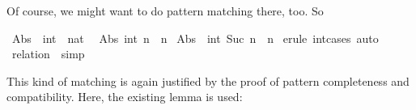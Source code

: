 \begin{isabellebody}
\begin{isamarkuptext}
  Of course, we might want to do pattern matching there, too. So%
\end{isamarkuptext}%
\isamarkuptrue%
\isamarkupfalse%
\ Abs\ {\isacharcolon}{\isacharcolon}\ {\isachardoublequoteopen}int\ {\isasymRightarrow}\ nat{\isachardoublequoteclose}\isanewline
{}\isanewline
\ \ {\isachardoublequoteopen}Abs\ {\isacharparenleft}int\ n{\isacharparenright}\ {\isacharequal}\ n{\isachardoublequoteclose}\isanewline
{\isacharbar}\ {\isachardoublequoteopen}Abs\ {\isacharparenleft}{\isacharminus}\ int\ {\isacharparenleft}Suc\ n{\isacharparenright}{\isacharparenright}\ {\isacharequal}\ n{\isachardoublequoteclose}\isanewline
%
\isadelimproof
%
\endisadelimproof
%
\isatagproof
{}\isamarkupfalse%
\ {\isacharparenleft}erule\ int{\isacharunderscore}cases{\isacharparenright}\ auto%
\endisatagproof
{\isafoldproof}%
%
\isadelimproof
\isanewline
%
\endisadelimproof
{}\isamarkupfalse%
%
\isadelimproof
\ %
\endisadelimproof
%
\isatagproof
{}\isamarkupfalse%
\ {\isacharparenleft}relation\ {\isachardoublequoteopen}{\isacharbraceleft}{\isacharbraceright}{\isachardoublequoteclose}{\isacharparenright}\ simp%
\endisatagproof
{\isafoldproof}%
%
\isadelimproof
%
\endisadelimproof
%
\begin{isamarkuptext}%
This kind of matching is again justified by the proof of pattern
  completeness and compatibility. Here, the existing lemma  is used:


\end{isamarkuptext}
\end{isabellebody}
